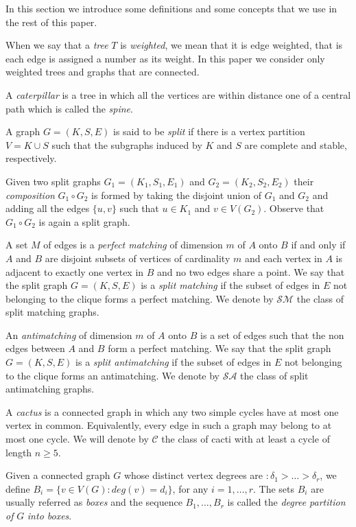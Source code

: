 \documentclass[dvipdfm]{llncs}
\begin{document}
In this section we introduce some definitions and some concepts that we use in the rest of  this paper. 

When we say that a {\em tree} $T$ is {\em weighted}, we mean that it is edge weighted, that is each edge is assigned a number as its weight. In this paper we consider only weighted trees and graphs that are connected.  


A {\em caterpillar} is a tree in which all the vertices are within distance one of a central path which is called the {\em spine}.


A graph $G=(K,S,E)$ is said to be\textit{ split} if there is a vertex partition \mbox{$V=K \cup S$} such that the subgraphs induced by $K$ and $S$ are complete and stable, respectively.  


Given two split graphs $G_1=(K_1,S_1,E_1)$ and $G_2=(K_2,S_2,E_2)$  their \textit{composition} $G_1\circ G_2$ is formed by taking the disjoint union of $G_1$ and $G_2$ and adding all the edges  $\{ u, v\}$ such that $u \in K_1$ and $v \in V(G_2)$. Observe that $G_1\circ G_2$ is again a split graph.


A set $M$ of edges is a {\em perfect matching} of dimension $m$ of $A$ onto $B$ if and only if $A$ and $B$ are disjoint subsets of vertices of cardinality $m$ and each vertex in $A$ is adjacent to exactly one vertex in $B$ and no two edges share a point. We say that the split graph $G=(K,S,E)$ is a  {\em split matching }if the subset of edges in $E$ not belonging to the clique forms a perfect matching. We denote by $\mathcal{SM}$ the class of split matching graphs.


An \textit{antimatching} of dimension $m$ of $A$ onto $B$ is a set of edges such that the non edges between $A$ and $B$ form a perfect matching. We say that the split graph $G=(K,S,E)$ is a \textit{split antimatching }if the subset of edges in $E$ not belonging to the clique forms an antimatching. We denote by $\mathcal{SA}$ the class of split antimatching graphs.


A {\em cactus} is a connected graph in which any two simple cycles have at most one vertex in common. Equivalently, every edge in such a graph may belong to at most one cycle. We will denote by $\mathcal{C}$ the class of cacti with at least a cycle of length $n \geq 5$.


Given a connected graph $G$ whose distinct vertex degrees are \mbox{$: \delta_1 >  \ldots > \delta_r$}, we define $B_i=\{ v \in V(G): deg(v)= d_i\}$, for any $i=1, \ldots, r$.  The sets $B_i$ are usually referred as {\em boxes }and the sequence $B_1, \ldots, B_r$ is called the \textit{degree partition of} $G$ \textit{into boxes}. 
\end{document}
